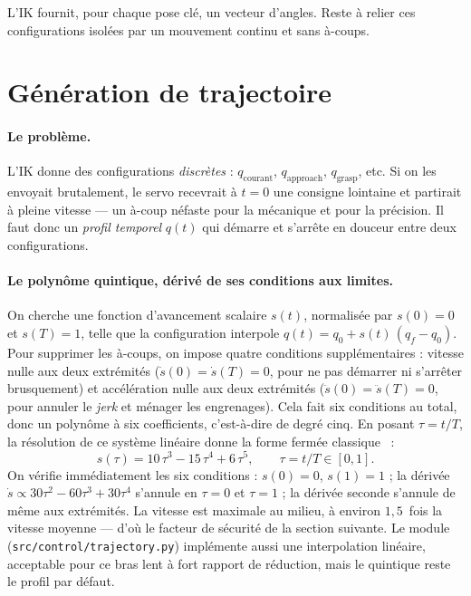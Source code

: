 L'IK fournit, pour chaque pose clé, un vecteur d'angles. Reste à relier ces
configurations isolées par un mouvement continu et sans à-coups.

\section{Génération de trajectoire}
\label{sec:trajectory}

\paragraph{Le problème.} L'IK donne des configurations \emph{discrètes} :
$q_{\text{courant}}$, $q_{\text{approach}}$, $q_{\text{grasp}}$, etc. Si on les
envoyait brutalement, le servo recevrait à $t=0$ une consigne lointaine et
partirait à pleine vitesse — un à-coup néfaste pour la mécanique et pour la
précision. Il faut donc un \emph{profil temporel} $q(t)$ qui démarre et s'arrête
en douceur entre deux configurations.

\paragraph{Le polynôme quintique, dérivé de ses conditions aux limites.} On
cherche une fonction d'avancement scalaire $s(t)$, normalisée par $s(0)=0$ et
$s(T)=1$, telle que la configuration interpole $q(t) = q_0 + s(t)\,(q_f - q_0)$.
Pour supprimer les à-coups, on impose quatre conditions supplémentaires : vitesse
nulle aux deux extrémités ($\dot s(0)=\dot s(T)=0$, pour ne pas démarrer ni
s'arrêter brusquement) et accélération nulle aux deux extrémités ($\ddot s(0)=
\ddot s(T)=0$, pour annuler le \emph{jerk} et ménager les engrenages). Cela fait
six conditions au total, donc un polynôme à six coefficients, c'est-à-dire de
degré cinq. En posant $\tau = t/T$, la résolution de ce système linéaire donne la
forme fermée classique~\cite{siciliano_robotics_2009} :
\begin{equation}
  s(\tau) = 10\,\tau^3 - 15\,\tau^4 + 6\,\tau^5,
  \qquad \tau = t/T \in [0,1].
  \label{eq:quintic}
\end{equation}
On vérifie immédiatement les six conditions : $s(0)=0$, $s(1)=1$ ; la dérivée
$\dot s \propto 30\tau^2 - 60\tau^3 + 30\tau^4$ s'annule en $\tau=0$ et $\tau=1$ ;
la dérivée seconde s'annule de même aux extrémités. La vitesse est maximale au
milieu, à environ $1{,}5$~fois la vitesse moyenne — d'où le facteur de sécurité de
la section suivante. Le module (\texttt{src/control/trajectory.py}) implémente
aussi une interpolation linéaire, acceptable pour ce bras lent à fort rapport de
réduction, mais le quintique reste le profil par défaut.

